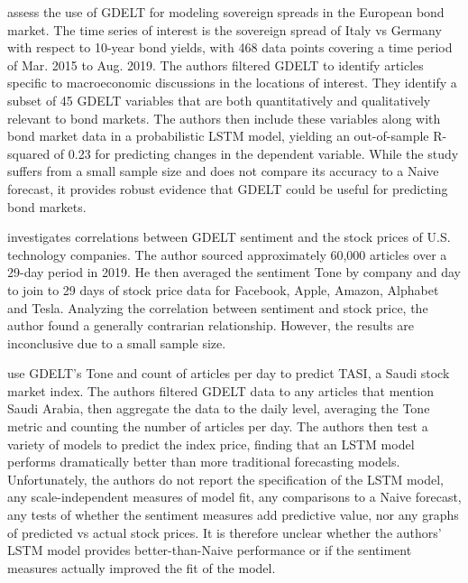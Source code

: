 \documentclass[12pt]{article}
\begin{document}
\cite{consoli2021information} assess the use of GDELT for modeling sovereign spreads in the European bond market. The time series of interest is the sovereign spread of Italy vs Germany with respect to 10-year bond yields, with 468 data points covering a time period of Mar. 2015 to Aug. 2019. The authors filtered GDELT to identify articles specific to macroeconomic discussions in the locations of interest. They identify a subset of 45 GDELT variables that are both quantitatively and qualitatively relevant to bond markets. The authors then include these variables along with bond market data in a probabilistic LSTM model, yielding an out-of-sample R-squared of 0.23 for predicting changes in the dependent variable. While the study suffers from a small sample size and does not compare its accuracy to a Naive forecast, it provides robust evidence that GDELT could be useful for predicting bond markets.

\cite{jakel2019using} investigates correlations between GDELT sentiment and the stock prices of U.S. technology companies. The author sourced approximately 60,000 articles over a 29-day period in 2019. He then averaged the sentiment Tone by company and day to join to 29 days of stock price data for Facebook, Apple, Amazon, Alphabet and Tesla. Analyzing the correlation between sentiment and stock price, the author found a generally contrarian relationship. However, the results are inconclusive due to a small sample size.

\cite{alamro2019predicting} use GDELT's Tone and count of articles per day to predict TASI, a Saudi stock market index. The authors filtered GDELT data to any articles that mention Saudi Arabia, then aggregate the data to the daily level, averaging the Tone metric and counting the number of articles per day. The authors then test a variety of models to predict the index price, finding that an LSTM model performs dramatically better than more traditional forecasting models. Unfortunately, the authors do not report the specification of the LSTM model, any scale-independent measures of model fit, any comparisons to a Naive forecast, any tests of whether the sentiment measures add predictive value, nor any graphs of predicted vs actual stock prices. It is therefore unclear whether the authors' LSTM model provides better-than-Naive performance or if the sentiment measures actually improved the fit of the model.
\end{document}
